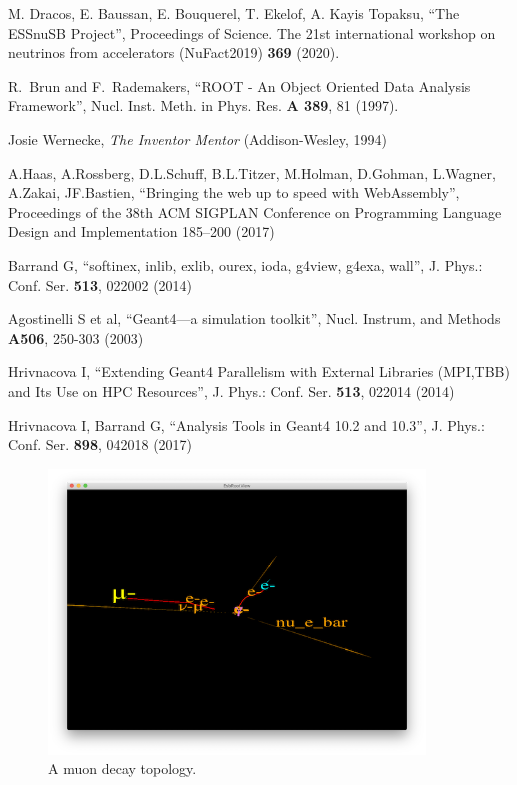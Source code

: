 \documentclass{webofc}
\begin{document}
\begin{thebibliography}{}

  M. Dracos, E. Baussan, E. Bouquerel, T. Ekelof, A. Kayis Topaksu,
  ``The ESSnuSB Project'',
  Proceedings of Science. The 21st international workshop on neutrinos
  from accelerators (NuFact2019) \textbf{369} (2020).
  
 R.~Brun and F.~Rademakers,
 ``ROOT - An Object Oriented Data Analysis Framework'',
 Nucl. Inst. Meth. in Phys. Res. \textbf{A 389}, 81 (1997).

  Josie Wernecke,
  \textit{The Inventor Mentor}
  (Addison-Wesley, 1994)

  A.Haas, A.Rossberg,  D.L.Schuff,  B.L.Titzer,  M.Holman, D.Gohman, L.Wagner, A.Zakai, JF.Bastien,
  ``Bringing the web up to speed with WebAssembly'',
  Proceedings of the 38th ACM SIGPLAN Conference on Programming
  Language Design and Implementation 185–200 (2017)
  
  Barrand G,
  ``softinex, inlib, exlib, ourex, ioda, g4view, g4exa, wall'',
  J. Phys.: Conf. Ser. \textbf{513}, 022002 (2014)

  Agostinelli S et al,
  ``Geant4—a simulation toolkit'',
  Nucl. Instrum, and Methods \textbf{A506}, 250-303 (2003)

  Hrivnacova I,
  ``Extending Geant4 Parallelism with External Libraries (MPI,TBB) and Its Use on HPC Resources'',
  J. Phys.: Conf. Ser. \textbf{513}, 022014 (2014)

  Hrivnacova I, Barrand G,
  ``Analysis Tools in Geant4 10.2 and 10.3'',
  J. Phys.: Conf. Ser. \textbf{898}, 042018 (2017)

\end{thebibliography}

\begin{figure}[ht]
\centering
\includegraphics[width=10cm,clip]{neard_MCTrack_arrow}
\caption{A muon decay topology.}
\label{fig-muon-decay}
\end{figure}
\end{document}
